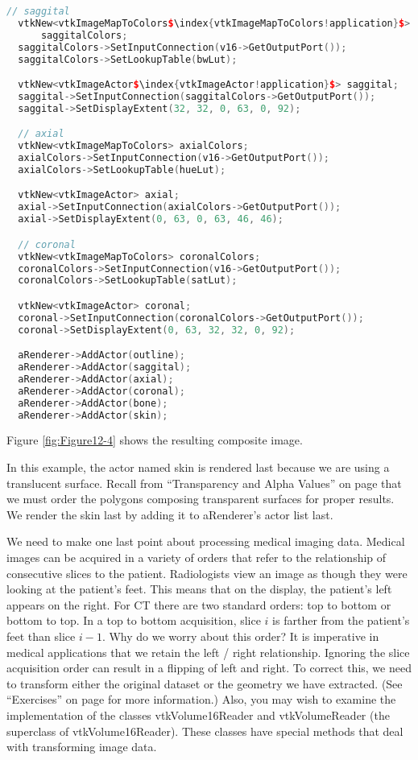 \begin{lstlisting}[language=C++, caption={Mapping the image data and displaying the image slices.}, escapechar=\$]
  // saggital
  vtkNew<vtkImageMapToColors$\index{vtkImageMapToColors!application}$>
      saggitalColors;
  saggitalColors->SetInputConnection(v16->GetOutputPort());
  saggitalColors->SetLookupTable(bwLut);

  vtkNew<vtkImageActor$\index{vtkImageActor!application}$> saggital;
  saggital->SetInputConnection(saggitalColors->GetOutputPort());
  saggital->SetDisplayExtent(32, 32, 0, 63, 0, 92);

  // axial
  vtkNew<vtkImageMapToColors> axialColors;
  axialColors->SetInputConnection(v16->GetOutputPort());
  axialColors->SetLookupTable(hueLut);

  vtkNew<vtkImageActor> axial;
  axial->SetInputConnection(axialColors->GetOutputPort());
  axial->SetDisplayExtent(0, 63, 0, 63, 46, 46);

  // coronal
  vtkNew<vtkImageMapToColors> coronalColors;
  coronalColors->SetInputConnection(v16->GetOutputPort());
  coronalColors->SetLookupTable(satLut);

  vtkNew<vtkImageActor> coronal;
  coronal->SetInputConnection(coronalColors->GetOutputPort());
  coronal->SetDisplayExtent(0, 63, 32, 32, 0, 92);

  aRenderer->AddActor(outline);
  aRenderer->AddActor(saggital);
  aRenderer->AddActor(axial);
  aRenderer->AddActor(coronal);
  aRenderer->AddActor(bone);
  aRenderer->AddActor(skin);
\end{lstlisting}

\noindent Figure \ref{fig:Figure12-4} shows the resulting composite image.

In this example, the actor named skin is rendered last because we are using a translucent surface. Recall from ``Transparency and Alpha Values'' on page \pageref{sec:transparency_alpha} that we must order the polygons  composing transparent surfaces for proper results. We render the skin last by adding it to aRenderer's actor list last.

We need to make one last point about processing medical imaging data. Medical images can be acquired in a variety of orders that refer to the relationship of consecutive slices to the patient. Radiologists view an image as though they were looking at the patient's feet. This means that on the display, the patient's left appears on the right. For CT there are two standard orders: top to bottom or bottom to top. In a top to bottom acquisition, slice $i$ is farther from the patient's feet than slice $i-1$. Why do we worry about this order? It is imperative in medical applications that we retain the left / right relationship. Ignoring the slice acquisition order can result in a flipping of left and right. To correct this, we need to transform either the original dataset or the geometry we have extracted. (See ``Exercises'' on page \pageref{exercises:ch_12} for more information.) Also, you may wish to examine the implementation of the classes vtkVolume16Reader and vtkVolumeReader (the superclass of vtkVolume16Reader). These classes have special methods that deal with transforming image data.

